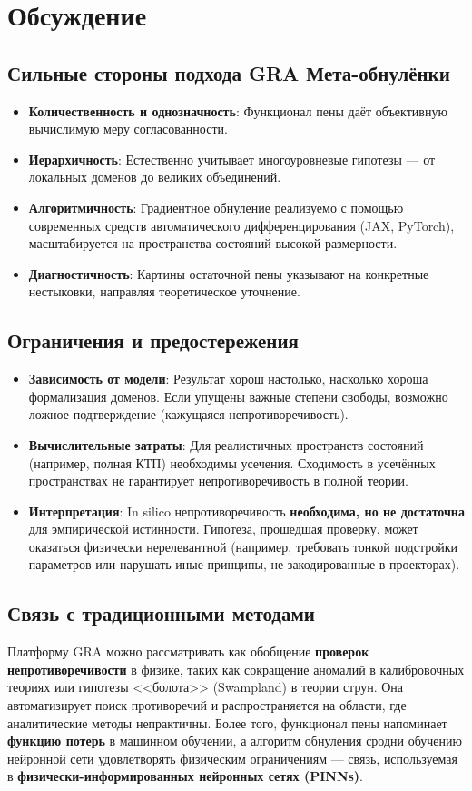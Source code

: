 \documentclass[11pt,a4paper]{article}
\begin{document}
\section{Обсуждение}

\subsection{Сильные стороны подхода GRA Мета-обнулёнки}
\begin{itemize}
    \item \textbf{Количественность и однозначность}: Функционал пены даёт объективную вычислимую меру согласованности.
    \item \textbf{Иерархичность}: Естественно учитывает многоуровневые гипотезы — от локальных доменов до великих объединений.
    \item \textbf{Алгоритмичность}: Градиентное обнуление реализуемо с помощью современных средств автоматического дифференцирования (JAX, PyTorch), масштабируется на пространства состояний высокой размерности.
    \item \textbf{Диагностичность}: Картины остаточной пены указывают на конкретные нестыковки, направляя теоретическое уточнение.
\end{itemize}

\subsection{Ограничения и предостережения}
\begin{itemize}
    \item \textbf{Зависимость от модели}: Результат хорош настолько, насколько хороша формализация доменов. Если упущены важные степени свободы, возможно ложное подтверждение (кажущаяся непротиворечивость).
    \item \textbf{Вычислительные затраты}: Для реалистичных пространств состояний (например, полная КТП) необходимы усечения. Сходимость в усечённых пространствах не гарантирует непротиворечивость в полной теории.
    \item \textbf{Интерпретация}: In silico непротиворечивость \textbf{необходима, но не достаточна} для эмпирической истинности. Гипотеза, прошедшая проверку, может оказаться физически нерелевантной (например, требовать тонкой подстройки параметров или нарушать иные принципы, не закодированные в проекторах).
\end{itemize}

\subsection{Связь с традиционными методами}
Платформу GRA можно рассматривать как обобщение \textbf{проверок непротиворечивости} в физике, таких как сокращение аномалий в калибровочных теориях или гипотезы <<болота>> (Swampland) в теории струн. Она автоматизирует поиск противоречий и распространяется на области, где аналитические методы непрактичны. Более того, функционал пены напоминает \textbf{функцию потерь} в машинном обучении, а алгоритм обнуления сродни обучению нейронной сети удовлетворять физическим ограничениям — связь, используемая в \textbf{физически-информированных нейронных сетях (PINNs)}.
\end{document}
